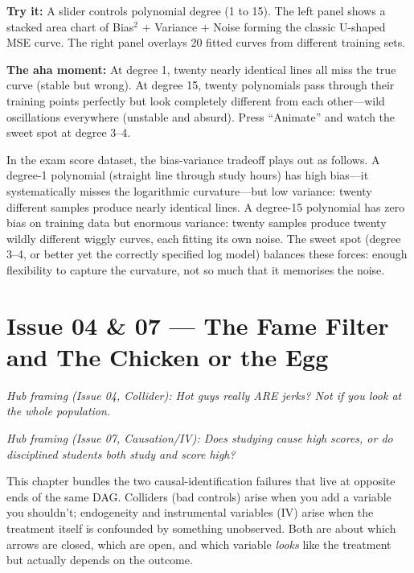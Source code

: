 \documentclass[11pt,a4paper]{article}
\theoremstyle{definition}
\theoremstyle{plain}
\theoremstyle{remark}
\begin{document}
\begin{vizspec}[title={``The U-Shaped Trap'' --- Bias-Variance Explorer}]
\textbf{Try it:} A slider controls polynomial degree (1 to 15). The left panel shows a stacked area chart of Bias$^2$ + Variance + Noise forming the classic U-shaped MSE curve. The right panel overlays 20 fitted curves from different training sets.

\textbf{The aha moment:} At degree 1, twenty nearly identical lines all miss the true curve (stable but wrong). At degree 15, twenty polynomials pass through their training points perfectly but look completely different from each other---wild oscillations everywhere (unstable and absurd). Press ``Animate'' and watch the sweet spot at degree 3--4.
\end{vizspec}

In the exam score dataset, the bias-variance tradeoff plays out as follows. A degree-1 polynomial (straight line through study hours) has high bias---it systematically misses the logarithmic curvature---but low variance: twenty different samples produce nearly identical lines. A degree-15 polynomial has zero bias on training data but enormous variance: twenty samples produce twenty wildly different wiggly curves, each fitting its own noise. The sweet spot (degree 3--4, or better yet the correctly specified log model) balances these forces: enough flexibility to capture the curvature, not so much that it memorises the noise.

\section{Issue 04 \& 07 --- The Fame Filter and The Chicken or the Egg}\label{sec:causation}

\noindent\emph{Hub framing (Issue 04, Collider): Hot guys really ARE jerks? Not if you look at the whole population.}

\noindent\emph{Hub framing (Issue 07, Causation/IV): Does studying cause high scores, or do disciplined students both study and score high?}

\smallskip

\noindent This chapter bundles the two causal-identification failures that live at opposite ends of the same DAG. Colliders (bad controls) arise when you add a variable you shouldn't; endogeneity and instrumental variables (IV) arise when the treatment itself is confounded by something unobserved. Both are about which arrows are closed, which are open, and which variable \emph{looks} like the treatment but actually depends on the outcome.
\end{document}
